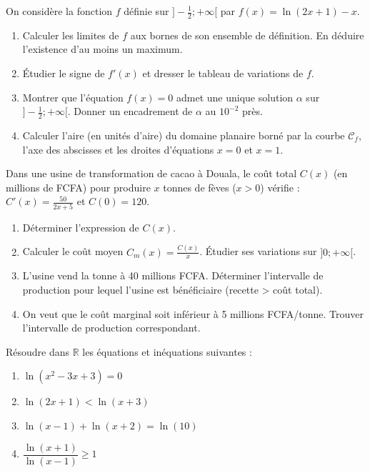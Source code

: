 \documentclass[11pt]{article}
\begin{document}
\begin{exercice}
On considère la fonction $f$ définie sur $]-\frac{1}{2}; +\infty[$ par $f(x) = \ln(2x+1) - x$.
\begin{enumerate}
    \item Calculer les limites de $f$ aux bornes de son ensemble de définition. En déduire l'existence d'au moins un maximum.
    \item Étudier le signe de $f'(x)$ et dresser le tableau de variations de $f$.
    \item Montrer que l'équation $f(x) = 0$ admet une unique solution $\alpha$ sur $]-\frac{1}{2}; +\infty[$. Donner un encadrement de $\alpha$ au $10^{-2}$ près.
    \item Calculer l'aire (en unités d'aire) du domaine planaire borné par la courbe $\mathcal{C}_f$, l'axe des abscisses et les droites d'équations $x=0$ et $x=1$.
\end{enumerate}
\end{exercice}

\begin{exercice}
Dans une usine de transformation de cacao à Douala, le coût total $C(x)$ (en millions de FCFA) pour produire $x$ tonnes de fèves ($x > 0$) vérifie : $C'(x) = \frac{50}{2x+5}$ et $C(0) = 120$.
\begin{enumerate}
    \item Déterminer l'expression de $C(x)$.
    \item Calculer le coût moyen $C_m(x) = \frac{C(x)}{x}$. Étudier ses variations sur $]0; +\infty[$.
    \item L'usine vend la tonne à 40 millions FCFA. Déterminer l'intervalle de production pour lequel l'usine est bénéficiaire (recette > coût total).
    \item On veut que le coût marginal soit inférieur à 5 millions FCFA/tonne. Trouver l'intervalle de production correspondant.
\end{enumerate}
\end{exercice}

\begin{exercice}
Résoudre dans $\mathbb{R}$ les équations et inéquations suivantes :
\begin{enumerate}
    \item $\ln(x^2 - 3x + 3) = 0$
    \item $\ln(2x+1) < \ln(x+3)$
    \item $\ln(x-1) + \ln(x+2) = \ln(10)$
    \item $\dfrac{\ln(x+1)}{\ln(x-1)} \geq 1$
\end{enumerate}
\end{exercice}
\end{document}
